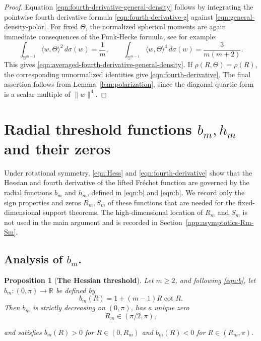 \documentclass{amsart}
\newtheorem{proposition}[theorem]{Proposition}
\theoremstyle{definition}
\theoremstyle{remark}
\newcommand\0{\boldsymbol{0}}
\begin{document}
\begin{proof}
Equation \eqref{eqn:fourth-derivative-general-density} follows by integrating the pointwise fourth derivative formula \eqref{eqn:fourth-derivative-g} against \eqref{eqn:general-density-polar}.  For fixed \(\Theta\), the normalized spherical moments are again immediate consequences of the Funk-Hecke formula, see \cite{ChafaiFunkHecke} for example:
\[
    \int_{\mathbb S^{m-1}}\langle w,\Theta\rangle^2\,d\sigma(w)=\frac1m,
    \qquad
    \int_{\mathbb S^{m-1}}\langle w,\Theta\rangle^4\,d\sigma(w)=\frac{3}{m(m+2)}.
\]
This gives \eqref{eqn:averaged-fourth-derivative-general-density}.  If \(\rho(R,\Theta)=\rho(R)\), the corresponding unnormalized identities give \eqref{eqn:fourth-derivative}.  The final assertion follows from Lemma~\ref{lem:polarization}, since the diagonal quartic form is a scalar multiple of \(\|w\|^4\).
\end{proof}


\section{Radial threshold functions \(b_m,h_m\) and their zeros}
\label{scn:asymptotics-b-h}

Under rotational symmetry, \eqref{eqn:Hess} and \eqref{eqn:fourth-derivative} show that the Hessian and fourth derivative of the lifted Fréchet function are governed by the radial functions \(b_m\) and \(h_m\), defined in \eqref{eqn:b} and \eqref{eqn:h}. We record only the sign properties and zeros \(R_m,S_m\) of these functions that are needed for the fixed-dimensional support theorems. The high-dimensional location of \(R_m\) and \(S_m\) is not used in the main argument and is recorded in Section~\ref{app:asymptotics-Rm-Sm}.
\subsection{\textbf{Analysis of $b_m$.}}
\begin{proposition}[\textbf{The Hessian threshold}]
\label{prop:zero_bm}
Let \(m\ge2\), and following \eqref{eqn:b}, let \(b_m:(0,\pi)\to\mathbb R\) be defined by
\[
    b_m(R)=1+(m-1)R\cot R.
\]
Then \(b_m\) is strictly decreasing on \((0,\pi)\), has a unique zero
\begin{equation}\label{eqn:R_m}
    \boxed{R_m\in(\pi/2,\pi),}
\end{equation}
    

and satisfies \(b_m(R)>0\) for \(R\in(0,R_m)\) and \(b_m(R)<0\) for \(R\in(R_m,\pi)\).
\end{proposition}
\end{document}
